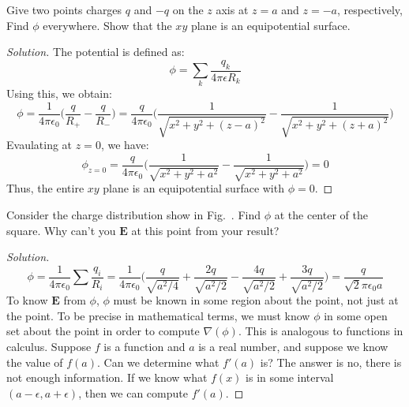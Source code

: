 \documentclass[crop=false,class=article,oneside]{standalone}
\begin{document}
    \begin{problem}[Wangsness 5-3]
        Give two points charges $q$ and $-q$ on the
        $z$ axis at $z=a$ and $z=-a$, respectively,
        Find $\phi$ everywhere. Show that the
        $xy$ plane is an equipotential surface.
    \end{problem}
    \begin{proof}[Solution]
        The potential is defined as:
        \begin{equation*}
            \phi=\sum_{k}\frac{q_{k}}{4\pi\epsilon{R_{k}}}
        \end{equation*}
        Using this, we obtain:
        \begin{equation*}
            \phi
            =\frac{1}{4\pi\epsilon_0}\bigg(
                \frac{q}{R_{+}}-\frac{q}{R_{-}}
            \bigg)
            =\frac{q}{4\pi\epsilon_0}
            \bigg(
                \frac{1}{\sqrt{x^2+y^2+(z-a)^2}}
                -\frac{1}{\sqrt{x^2+y^2+(z+a)^2}}
            \bigg)
        \end{equation*}
        Evaulating at $z=0$, we have:
        \begin{equation*}
            \phi_{z=0}
            =\frac{q}{4\pi\epsilon_0}\bigg(
                \frac{1}{\sqrt{x^2+y^2+a^2}}
                -\frac{1}{\sqrt{x^2+y^2+a^2}}
            \bigg)
            =0
        \end{equation*}
        Thus, the entire $xy$ plane is an
        equipotential surface with $\phi=0$.
    \end{proof}
    \begin{problem}[Wangsness 5-4]
        Consider the charge distribution show in
        Fig.~.
        Find $\phi$ at the center of the square.
        Why can't you $\mathbf{E}$ at this
        point from your result?
    \end{problem}
    \begin{proof}[Solution]
    \begin{equation*}
        \phi=\frac{1}{4\pi\epsilon_{0}}
        \sum\frac{q_{i}}{R_{i}}
        =\frac{1}{4\pi \epsilon_0}\bigg(
            \frac{q}{\sqrt{a^2/4}}
            +\frac{2q}{\sqrt{a^2/2}}
            -\frac{4q}{\sqrt{a^2/2}}
            +\frac{3q}{\sqrt{a^2/2}}
        \bigg)
        =\frac{q}{\sqrt{2}\pi\epsilon_{0}a}    
    \end{equation*}
    To know $\mathbf{E}$ from $\phi$,
    $\phi$ must be known in some region about the point,
    not just at the point. To be precise in mathematical terms,
    we must know $\phi$ in some open set about the point in
    order to compute $\nabla(\phi)$. This is analogous to
    functions in calculus. Suppose $f$ is a function and
    $a$ is a real number, and suppose we know the value
    of $f(a)$. Can we determine what $f'(a)$ is?
    The answer is no, there is not enough information.
    If we know what $f(x)$ is in some interval $(a-\epsilon,a+\epsilon)$, then we can compute $f'(a)$.
    \end{proof}
\end{document}
